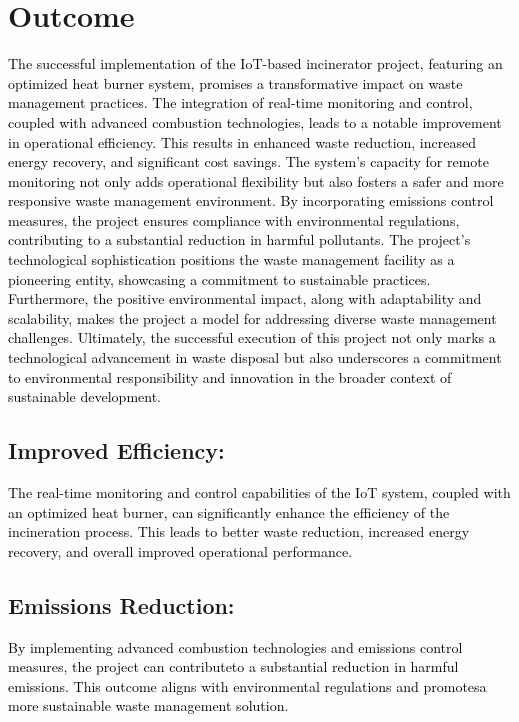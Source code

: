 \documentclass[letterpaper]{article}
\begin{document}
\section[Outcome]{Outcome}

\bigskip


\bigskip

\textcolor{black}{The successful implementation of the IoT-based incinerator project, featuring an optimized heat burner
system, promises a transformative impact on waste management practices. The integration of real-time monitoring and
control, coupled with advanced combustion technologies, leads to a notable improvement in operational efficiency. This
results in enhanced waste reduction, increased energy recovery, and significant cost savings. The system's capacity for
remote monitoring not only adds operational flexibility but also fosters a safer and more responsive waste management
environment. By incorporating emissions control measures, the project ensures compliance with environmental
regulations, contributing to a substantial reduction in harmful pollutants. The project's technological sophistication
positions the waste management facility as a pioneering entity, showcasing a commitment to sustainable practices.
Furthermore, the positive environmental impact, along with adaptability and scalability, makes the project a model for
addressing diverse waste management challenges. Ultimately, the successful execution of this project not only marks a
technological advancement in waste disposal but also underscores a commitment to environmental responsibility and
innovation in the broader context of sustainable development.}


\bigskip


\bigskip


\bigskip

\subsection{Improved Efficiency:}
\textcolor{black}{The real-time monitoring and control capabilities of the IoT system, coupled with an optimized heat
burner, can significantly enhance the efficiency of the incineration process. This leads to better waste reduction,
increased energy recovery, and overall improved operational performance.}

\subsection{Emissions Reduction:}
\textcolor{black}{By implementing advanced combustion technologies and emissions control measures, the project can
contributeto a substantial reduction in harmful emissions. This outcome aligns with environmental regulations and
promotesa more sustainable waste management solution.}
\end{document}
